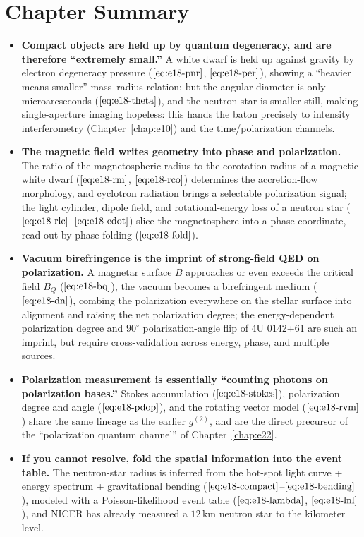 \section{Chapter Summary}
\label{sec:e18-summary}

\begin{itemize}
\item \textbf{Compact objects are held up by quantum degeneracy, and are therefore ``extremely small.''} A white dwarf is held up against gravity by electron degeneracy pressure (\(\eqref{eq:e18-pnr}\), \(\eqref{eq:e18-per}\)), showing a ``heavier means smaller'' mass--radius relation; but the angular diameter is only microarcseconds (\(\eqref{eq:e18-theta}\)), and the neutron star is smaller still, making single-aperture imaging hopeless: this hands the baton precisely to intensity interferometry (Chapter~\ref{chap:e10}) and the time/polarization channels.
\item \textbf{The magnetic field writes geometry into phase and polarization.} The ratio of the magnetospheric radius to the corotation radius of a magnetic white dwarf (\(\eqref{eq:e18-rm}\), \(\eqref{eq:e18-rco}\)) determines the accretion-flow morphology, and cyclotron radiation brings a selectable polarization signal; the light cylinder, dipole field, and rotational-energy loss of a neutron star (\(\eqref{eq:e18-rlc}\)--\(\eqref{eq:e18-edot}\)) slice the magnetosphere into a phase coordinate, read out by phase folding (\(\eqref{eq:e18-fold}\)).
\item \textbf{Vacuum birefringence is the imprint of strong-field QED on polarization.} A magnetar surface \(B\) approaches or even exceeds the critical field \(B_Q\) (\(\eqref{eq:e18-bq}\)), the vacuum becomes a birefringent medium (\(\eqref{eq:e18-dn}\)), combing the polarization everywhere on the stellar surface into alignment and raising the net polarization degree; the energy-dependent polarization degree and \(90^\circ\) polarization-angle flip of 4U 0142+61 are such an imprint, but require cross-validation across energy, phase, and multiple sources.
\item \textbf{Polarization measurement is essentially ``counting photons on polarization bases.''} Stokes accumulation (\(\eqref{eq:e18-stokes}\)), polarization degree and angle (\(\eqref{eq:e18-pdop}\)), and the rotating vector model (\(\eqref{eq:e18-rvm}\)) share the same lineage as the earlier \(g^{(2)}\), and are the direct precursor of the ``polarization quantum channel'' of Chapter~\ref{chap:e22}.
\item \textbf{If you cannot resolve, fold the spatial information into the event table.} The neutron-star radius is inferred from the hot-spot light curve + energy spectrum + gravitational bending (\(\eqref{eq:e18-compact}\)--\(\eqref{eq:e18-bending}\)), modeled with a Poisson-likelihood event table (\(\eqref{eq:e18-lambda}\), \(\eqref{eq:e18-lnl}\)), and NICER has already measured a \(12\,\mathrm{km}\) neutron star to the kilometer level.
\end{itemize}

